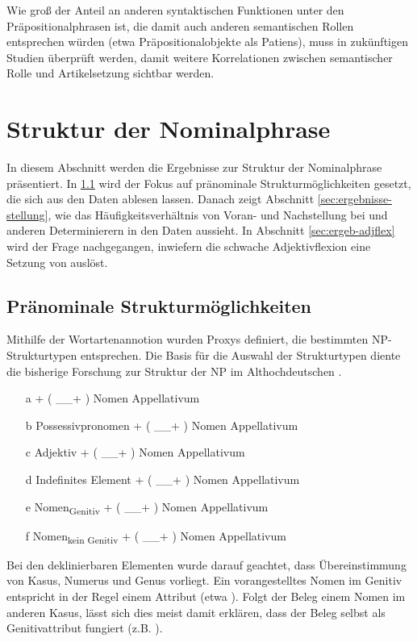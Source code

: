 Wie groß der Anteil an anderen syntaktischen Funktionen unter den Präpositionalphrasen ist, die damit auch anderen semantischen Rollen entsprechen würden (etwa Präpositionalobjekte als Patiens), muss in zukünftigen Studien überprüft werden, damit weitere Korrelationen zwischen semantischer Rolle und Artikelsetzung sichtbar werden. 


\section{Struktur der Nominalphrase}\label{erg:struktur.np}

In diesem Abschnitt werden die Ergebnisse zur Struktur der Nominalphrase präsentiert. In \ref{sec:ergeb-np-struktur} wird der Fokus auf pränominale Strukturmöglichkeiten gesetzt, die sich aus den Daten ablesen lassen. Danach zeigt Abschnitt \ref{sec:ergebnisse-stellung}, wie das Häufigkeitsverhältnis von Voran- und Nachstellung bei  und anderen Determinierern in den Daten aussieht. In Abschnitt \ref{sec:ergeb-adjflex} wird der Frage nachgegangen, inwiefern die schwache Adjektivflexion eine Setzung von   auslöst. 

\subsection{Pränominale Strukturmöglichkeiten}\label{sec:ergeb-np-struktur}

Mithilfe der Wortartenannotion wurden Proxys definiert, die bestimmten NP-Strukturtypen entsprechen. Die Basis für die Auswahl der Strukturtypen diente die bisherige Forschung zur Struktur der NP im Althochdeutschen \parencite[vor allem][]{Oubouzar1989}. 

\begin{itemize}
\item [a]  + ( \_\_+ )  Nomen Appellativum
\item [b] Possessivpronomen + ( \_\_+ )  Nomen Appellativum
\item [c] Adjektiv + ( \_\_+ )  Nomen Appellativum
\item [d] Indefinites Element + ( \_\_+ )   Nomen Appellativum
\item [e] Nomen\textsubscript{Genitiv} + ( \_\_+ )   Nomen Appellativum
\item [f]Nomen\textsubscript{kein Genitiv}  + ( \_\_+ )   Nomen Appellativum
\end{itemize}

\noindent 
Bei den deklinierbaren Elementen wurde darauf geachtet, dass Übereinstimmung von Kasus, Numerus und Genus vorliegt. Ein vorangestelltes Nomen im Genitiv entspricht in der Regel einem Attribut (etwa ). Folgt der Beleg einem Nomen im anderen Kasus, lässt sich dies meist damit erklären, dass  der Beleg selbst als Genitivattribut fungiert (z.B. ). 
 
